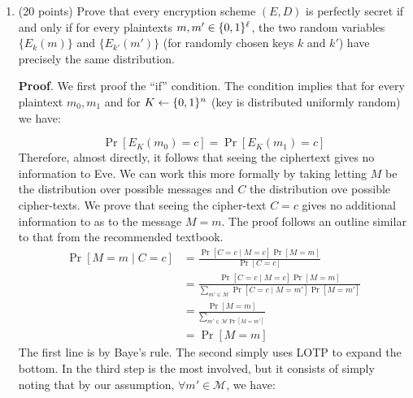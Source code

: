 \documentclass{article}
\begin{document}
\begin{enumerate}[noitemsep,topsep=\mdcompacttopsep,start=4]%

\item{}(20 points) Prove that every encryption scheme $(E,D)$ is perfectly secret if and only if for every plaintexts $m,m' \in \{0,1\}^\ell$, the two
random variables $\{ E_k(m) \}$ and $\{ E_{k'}(m') \}$ (for randomly chosen keys $k$ and $k'$)
have precisely the same distribution.

\begin{mdbmarginx}{1ex}{0pt}{1ex}{0pt}%
\noindent{}\textbf{Proof}.  We first proof the \textquotedblleft{}if\textquotedblright{} condition. The condition implies that for every plaintext $m_0,m_1$ and for $K \gets \{0,1\}^{n}$ (key is distributed uniformly random)
we have:%
\end{mdbmarginx}%
\noindent\noindent\[%
\Pr[E_K(m_0) = c] = \Pr[E_K(m_1) = c] 
\]%
Therefore, almost directly, it follows that seeing the ciphertext gives no information to Eve.
We can work this more formally by taking letting $M$ be the distribution over possible messages and $C$ the distribution ove possible cipher-texts.
We prove that seeing the cipher-text $C = c$ gives no additional information to as to the message $M = m$.
The proof follows an outline similar to that from the recommended textbook.
\noindent\noindent\[%
\begin{aligned}
\Pr[M = m \mid C = c] &= \frac{\Pr[C = c \mid M = c] \Pr[M = m]}{\Pr[C = c]} \\
&= \frac{\Pr[C = c \mid M = c] \Pr[M = m]}{\sum_{m' \in \mathcal{M}} \Pr[C = c \mid M = m'] \Pr[M = m']} \\
&= \frac{\Pr[M = m]}{\sum_{m' \in \mathcal{M} \Pr[M = m']}} \\
&= \Pr[M = m]
\end{aligned}
\]%
The first line is by Baye's rule.
The second simply uses LOTP to expand the bottom.
In the third step is the most involved, but it consists of simply noting that by our assumption, $\forall m' \in \mathcal{M}$, we have:

\end{enumerate}
\end{document}
